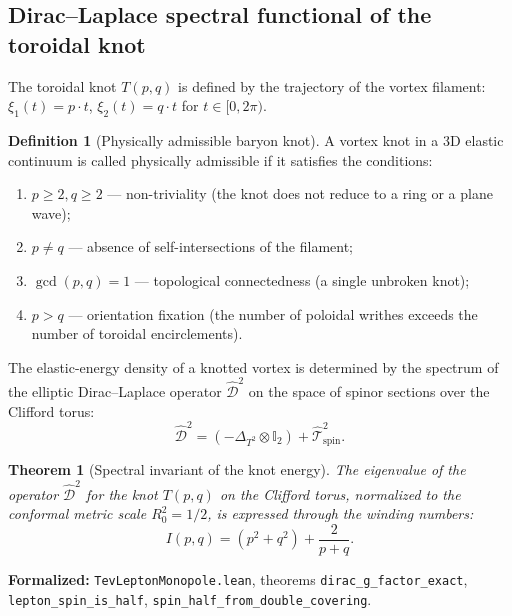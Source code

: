 \documentclass[11pt,a4paper]{article}
\newtheorem{theorem}{Theorem}
\theoremstyle{definition}
\newtheorem{definition}{Definition}
\theoremstyle{remark}
\begin{document}
\subsection{Dirac--Laplace spectral functional of the toroidal knot}
	
The toroidal knot $T(p,q)$ is defined by the trajectory of the vortex filament: $\xi_1(t) = p \cdot t$, $\xi_2(t) = q \cdot t$ for $t \in [0, 2\pi)$.
	
\begin{definition}[Physically admissible baryon knot]
A vortex knot in a 3D elastic continuum is called physically admissible if it satisfies the conditions:
\begin{enumerate}
	\item $p \ge 2, q \ge 2$ — non-triviality (the knot does not reduce to a ring or a plane wave);
	\item $p \ne q$ — absence of self-intersections of the filament;
	\item $\gcd(p, q) = 1$ — topological connectedness (a single unbroken knot);
	\item $p > q$ — orientation fixation (the number of poloidal writhes exceeds the number of toroidal encirclements).
\end{enumerate}
\end{definition}
	
The elastic-energy density of a knotted vortex is determined by the spectrum of the elliptic Dirac--Laplace operator $\hat{\mathcal{D}}^2$ on the space of spinor sections over the Clifford torus:
\begin{equation}
\hat{\mathcal{D}}^2 = \left( -\Delta_{T^2} \otimes \mathbb{I}_2 \right) + \hat{\mathcal{T}}_{\mathrm{spin}}^2.
\label{eq:dirac_laplace_operator_def}
\end{equation}
	
\begin{theorem}[Spectral invariant of the knot energy]
\label{thm:knot_energy}
The eigenvalue of the operator $\hat{\mathcal{D}}^2$ for the knot $T(p,q)$ on the Clifford torus, normalized to the conformal metric scale $R_0^2 = 1/2$, is expressed through the winding numbers:
\begin{equation}
I(p, q) = (p^2 + q^2) + \frac{2}{p + q}.
\label{eq:knot_energy_invariant_formula}
\end{equation}
\end{theorem}

\noindent\small\textbf{Formalized:} \texttt{TevLeptonMonopole.lean}, theorems \texttt{dirac_g_factor_exact}, \texttt{lepton_spin_is_half}, \texttt{spin_half_from_double_covering}.
\end{document}
